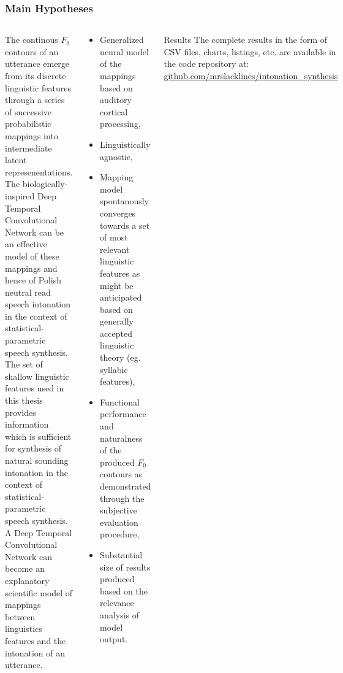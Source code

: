 \documentclass[a4paper,9pt]{beamer}
\theoremstyle{mytheoremstyle}
\newenvironment{hypothesis}[1]
  {\renewcommand\theinnerhypothesis{#1}\innerhypothesis}
  {\endinnerhypothesis}
\begin{document}
\begin{frame}
\frametitle{Main Hypotheses}
\scriptsize{
\begin{columns}
\begin{tcolorbox}
\begin{hypothesis}{1} The continous $F_0$ contours of an utterance emerge from its discrete linguistic features through a series of successive probabilistic mappings into intermediate latent represenentations.
\end{hypothesis}
\begin{hypothesis}{2}
The biologically-inspired Deep Temporal Convolutional Network can be an effective model of these mappings and hence of Polish neutral read speech intonation in the context of statistical-parametric speech synthesis. 
\end{hypothesis}
\begin{hypothesis}{3}
The set of shallow linguistic features used in this thesis provides information which is sufficient for synthesis of natural sounding intonation in the context of statistical-parametric speech synthesis. 
\end{hypothesis}
\begin{hypothesis}{4}
A Deep Temporal Convolutional Network can become an explanatory scientific model of mappings between linguistics features and the intonation of an utterance.
\end{hypothesis}
\end{tcolorbox}
\begin{exampleblock}{}
\begin{itemize}
\item[\checkmark] Generalized neural model of the mappings based on auditory cortical processing,
\item[\checkmark] Linguistically agnostic,
\item[\checkmark] Mapping model spontanously converges towards a set of most relevant linguistic features as might be anticipated based on generally accepted linguistic theory (eg. syllabic features),
\item[\checkmark] Functional performance and naturalness of the produced $F_{0}$ contours as demonstrated through the subjective evaluation procedure,
\item[\checkmark] Substantial size of results produced based on the relevance analysis of model output.
\end{itemize}
\end{exampleblock}
\begin{block}{Results}
The complete results in the form of CSV files, charts, listings, etc. are available in the code repository at:\\
\url{github.com/mrslacklines/intonation_synthesis}
\end{block}
\end{columns}
}
\end{frame}
\end{document}
